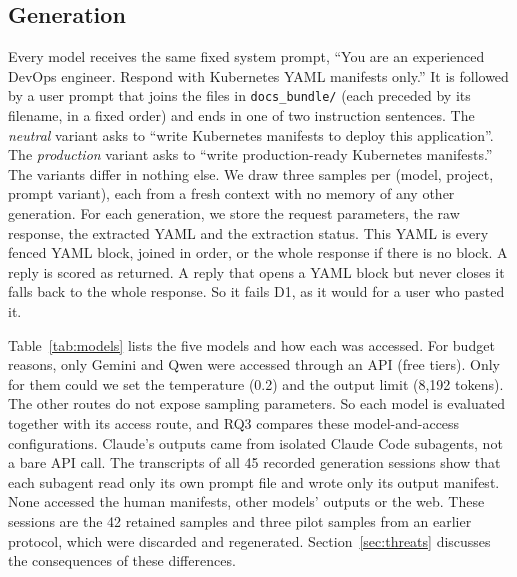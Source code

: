 \subsection{Generation}\label{sec:method-generation}

Every model receives the same fixed system prompt, ``You are an experienced DevOps engineer. Respond with Kubernetes YAML manifests only.'' It is followed by a user prompt that joins the files in \texttt{docs\_bundle/} (each preceded by its filename, in a fixed order) and ends in one of two instruction sentences. The \emph{neutral} variant asks to ``write Kubernetes manifests to deploy this application''. The \emph{production} variant asks to ``write production-ready Kubernetes manifests.'' The variants differ in nothing else. We draw three samples per (model, project, prompt variant), each from a fresh context with no memory of any other generation. For each generation, we store the request parameters, the raw response, the extracted YAML and the extraction status. This YAML is every fenced YAML block, joined in order, or the whole response if there is no block. A reply is scored as returned. A reply that opens a YAML block but never closes it falls back to the whole response. So it fails D1, as it would for a user who pasted it.

Table~\ref{tab:models} lists the five models and how each was accessed. For budget reasons, only Gemini and Qwen were accessed through an API (free tiers). Only for them could we set the temperature (0.2) and the output limit (8,192 tokens). The other routes do not expose sampling parameters. So each model is evaluated together with its access route, and RQ3 compares these model-and-access configurations. Claude's outputs came from isolated Claude Code subagents, not a bare API call. The transcripts of all 45 recorded generation sessions show that each subagent read only its own prompt file and wrote only its output manifest. None accessed the human manifests, other models' outputs or the web. These sessions are the 42 retained samples and three pilot samples from an earlier protocol, which were discarded and regenerated. Section~\ref{sec:threats} discusses the consequences of these differences.

